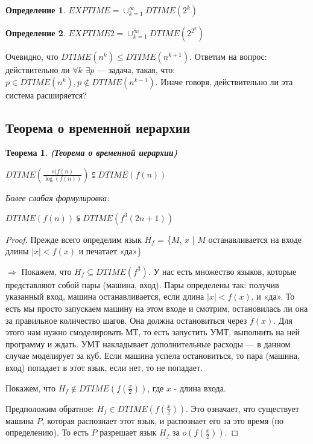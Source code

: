 \documentclass[a4paper]{article}
\newtheorem{theorem} {Теорема}
\newtheorem{definition}{Определение}
\begin{document}
{\begin{definition} $EXPTIME = \cup_{k=1}^{\infty}DTIME(2^{k})$
\end{definition}

\begin{definition} $EXPTIME2 = \cup_{k=1}^{\infty}DTIME(2^{2^{k}})$
\end{definition}

Очевидно, что $DTIME(n^{k}) \le DTIME(n^{k+1})$. Ответим на вопрос: действительно ли $\forall k$ $\exists p$ — задача, такая, что: $p \in  DTIME(n^{k}), p \notin DTIME(n^{k-1})$. Иначе говоря, действительно ли эта система расширяется?

\subsection{Теорема о временной иерархии}

\begin{theorem} \textbf{(Теорема о временной иерархии)} 

$DTIME(\frac{o(f(n)}{\log(f(n))}) \subsetneqq DTIME(f(n))$

Более слабая формулировка:

$DTIME(f(n)) \subsetneqq DTIME(f^{3}(2n+1))$

\end{theorem}

\begin{proof}
Прежде всего определим язык $H_{f}$ = \{$M$, $x$ | $M$ останавливается на входе длины $|x| < f(x)$  и печатает «да»\} 

$\Rightarrow$
Покажем, что $H_{f} \subseteq DTIME(f^{3})$. У нас есть множество языков, которые представляют собой пары (машина, вход). Пары определены так: получив указанный вход, машина останавливается, если длина $|x| < f(x)$, и «да». То есть мы просто запускаем машину на этом входе и смотрим, остановилась ли она за правильное количество шагов. Она должна остановиться через $f(x)$. Для этого нам нужно смоделировать МТ, то есть запустить УМТ, выполнить на ней программу и ждать. УМТ накладывает дополнительные расходы — в данном случае моделирует за куб. Если машина успела остановиться, то пара (машина, вход) попадает в этот язык, если нет, то не попадает.

Покажем, что $H_{f} \notin DTIME(f(\frac{x}{2}))$, где $x$ - длина входа.

Предположим обратное: $H_{f} \in DTIME(f(\frac{x}{2}))$. Это означает, что существует машина $P$, которая распознает этот язык, и распознает его за это время (по определению). То есть $P$ разрешает язык $H_{f}$ за $o(f(\frac{x}{2}))$.


\end{proof}}
\end{document}
